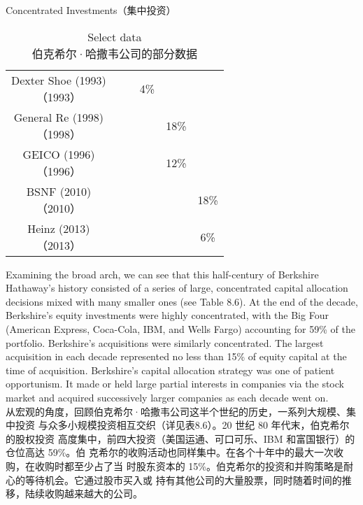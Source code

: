 \begin{section}{Concentrated Investments（集中投资）}
\begin{table}[!htbp]
\begin{center}
\begin{tabular}{cccccc}
      \makecell[c]{Dexter Shoe (1993) \\ （1993）} & & & 4\% & & \\
      \makecell[c]{General Re (1998) \\ （1998）} & & & & 18\% & \\
      \makecell[c]{GEICO (1996) \\ （1996）} & & & & 12\% & \\
      \makecell[c]{BSNF (2010) \\ （2010）} & & & & & 18\% \\
      \makecell[c]{Heinz (2013) \\ （2013）} & & & & & 6\% \\
      \bottomrule
    \end{tabular}
    \caption{Select data \\ 伯克希尔·哈撒韦公司的部分数据}
  \end{center}
\end{table}



\begin{verseparallel}
  {
    Examining the broad arch, we can see that this half-century of Berkshire
    Hathaway's history consisted of a series of large, concentrated capital
    allocation decisions mixed with many smaller ones (see Table 8.6). At the
    end of the decade, Berkshire's equity investments were highly concentrated,
    with the Big Four (American Express, Coca-Cola, IBM, and Wells Fargo)
    accounting for 59\% of the portfolio. Berkshire's acquisitions were
    similarly concentrated. The largest acquisition in each decade represented
    no less than 15\% of equity capital at the time of acquisition. Berkshire's
    capital allocation strategy was one of patient opportunism. It made or held
    large partial interests in companies via the stock market and acquired
    successively larger companies as each decade went on. \\
  }
  {
    从宏观的角度，回顾伯克希尔·哈撒韦公司这半个世纪的历史，一系列大规模、集中投资
    与众多小规模投资相互交织（详见表8.6）。20 世纪 80 年代末，伯克希尔的股权投资
    高度集中，前四大投资（美国运通、可口可乐、IBM 和富国银行）的仓位高达 59\%。伯
    克希尔的收购活动也同样集中。在各个十年中的最大一次收购，在收购时都至少占了当
    时股东资本的 15\%。伯克希尔的投资和并购策略是耐心的等待机会。它通过股市买入或
    持有其他公司的大量股票，同时随着时间的推移，陆续收购越来越大的公司。
  }
\end{verseparallel}
\end{section}


